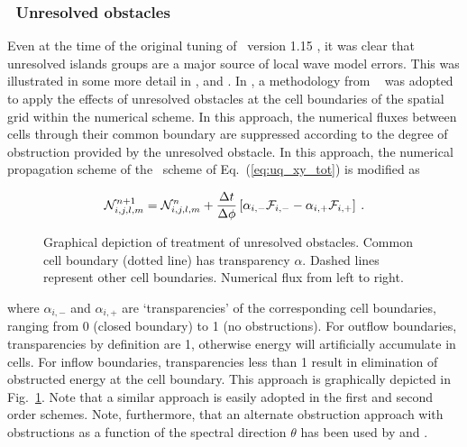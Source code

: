 \vsssub
\subsubsection{~Unresolved obstacles} \label{sub:num_obst}

\noindent
Even at the time of the original tuning of \ws\ version 1.15
\citep{tol:OMB02a}, it was clear that unresolved islands groups are a major
source of local wave model errors. This was illustrated in some more detail in
\citet[][Fig.~3]{tol:Waves01a}, and \citet[][Fig.~8]{tol:WaF02}. In \ws, a
methodology from \swan\ \citep{art:BRH99,man:SWAN3} was adopted to apply the
effects of unresolved obstacles at the cell boundaries of the spatial grid
within the numerical scheme. In this approach, the numerical fluxes between
cells through their common boundary are suppressed according to the degree of
obstruction provided by the unresolved obstacle. In this approach, the
numerical propagation scheme of the \uq\ scheme of Eq.~(\ref{eq:uq_xy_tot}) is
modified as


\begin{equation}
{\cal N}_{i,j,l,m}^{n+1} = {\cal N}_{i,j,l,m}^n +
\frac{\Delta t}{\Delta \phi} \left [ \alpha_{i,-} {\cal F}_{i,-} - \alpha_{i,+} {\cal F}_{i,+} \right ]
\: . \label{eq:uq_xy_obstr} \end{equation}

\begin{figure} \begin{center}
\caption{Graphical depiction of treatment of unresolved obstacles. Common cell
         boundary (dotted line) has transparency $\alpha$. Dashed lines
         represent other cell boundaries. Numerical flux from left to right.}
         \label{fig:obstr} \botline
\end{center}
\end{figure}

\noindent
where $\alpha_{i,-}$ and $\alpha_{i,+}$ are `transparencies' of the
corresponding cell boundaries, ranging from 0 (closed boundary) to 1 (no
obstructions). For outflow boundaries, transparencies by definition are 1,
otherwise energy will artificially accumulate in cells. For inflow boundaries,
transparencies less than 1 result in elimination of obstructed energy at the
cell boundary. This approach is graphically depicted in
Fig.~\ref{fig:obstr}. Note that a similar approach is easily adopted in the
first and second order schemes.  Note, furthermore, that an alternate
obstruction approach with obstructions as a function of the spectral direction
$\theta$ has been used by \cite{art:HY96} and \cite{art:HMM00}.

